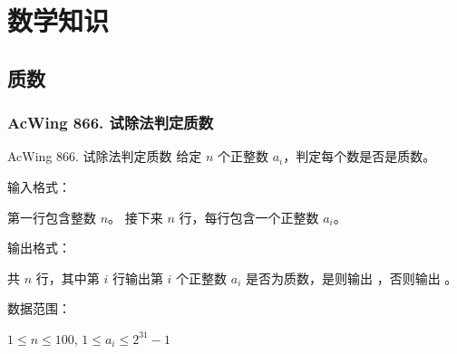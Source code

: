 \chapter{数学知识}


\section{质数}

\subsection{AcWing 866. 试除法判定质数}
\begin{titledbox}{AcWing 866. 试除法判定质数}
    给定 $n$ 个正整数 $a_i$，判定每个数是否是质数。

    输入格式：

    第一行包含整数 $n$。 接下来 $n$ 行，每行包含一个正整数 $a_i$。

    输出格式：

    共 $n$ 行，其中第 $i$ 行输出第 $i$ 个正整数 $a_i$ 是否为质数，是则输出 ，否则输出 。

    数据范围：

    $1 \le n \le 100$, $1 \le a_i \le 2^{31}-1$

    \begin{inputblock}
         \\
         \\
    \end{inputblock}
    \begin{outputblock}
         \\
    \end{outputblock}
\end{titledbox}

